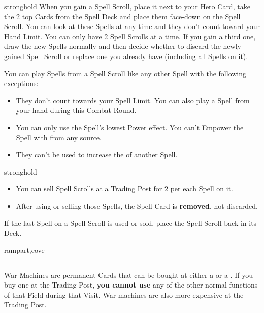 \begin{multicols*}{2}
\begin{expansion}{stronghold}
\vspace*{1em}
When you gain a Spell Scroll, place it next to your Hero Card, take the 2 top Cards from the Spell Deck and place them face-down on the Spell Scroll.
You can look at these Spells at any time and they don't count toward your Hand  Limit.
You can only have 2 Spell Scrolls at a time.
If you gain a third one, draw the new Spells normally and then decide whether to discard the newly gained Spell Scroll or replace one you already have (including all Spells on it).

\medskip

You can play Spells from a Spell Scroll like any other Spell with the following exceptions:
\begin{itemize}
    \item They don't count towards your Spell Limit.
    You can also play a Spell from your hand during this Combat Round.
    \item You can only use the Spell's lowest Power  effect.
    You can't Empower the Spell with  from any source.
    \item They can't be used to increase the  of another Spell.
\end{itemize}
\end{expansion}
\columnbreak
\begin{expansion}{stronghold}
    \begin{itemize}
    \item You can sell Spell Scrolls at a Trading Post for 2  per each Spell on it.
    \item After using or selling those Spells, the Spell Card is \textbf{removed}, not discarded.
\end{itemize}

If the last Spell on a Spell Scroll is used or sold, place the Spell Scroll back in its Deck.
\end{expansion}
\vspace*{1em}
\begin{expansion}{rampart,cove}
  \subsection*{}

  War Machines are permanent Cards that can be bought at either a  or a .
  If you buy one at the Trading Post, \textbf{you cannot use} any of the other normal functions of that Field during that Visit.
  War machines are also more expensive at the Trading Post.


\end{expansion}
\end{multicols*}

